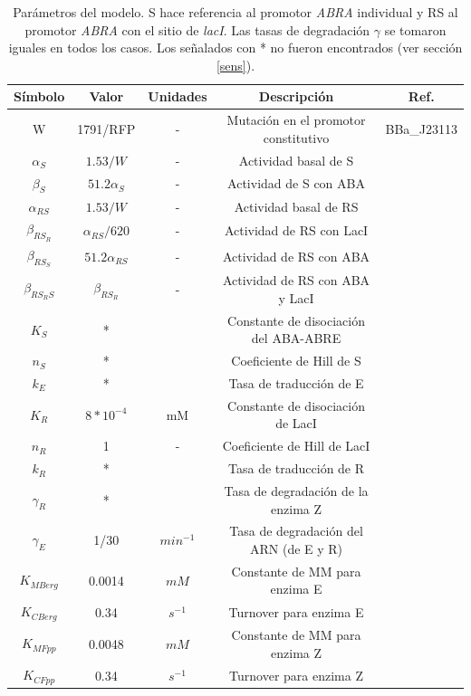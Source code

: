 \documentclass[12pt]{article}
\begin{document}
\begin{table}[H]
\centering
\begin{tabular}{c c c c c} 
 \hline
 S\'imbolo & Valor & Unidades & Descripci\'on & Ref. \\
 \hline\hline
 W & 1791/RFP & - & Mutaci\'on en el promotor constitutivo & BBa\_J23113 \\
 $\alpha_S$ & $1.53/W$ & - & Actividad basal de S & \cite{kelly09}  \\ 
 $\beta_S$ & $51.2 \alpha_S$ & - &  Actividad de S con ABA & \cite{hobo99} \\
 $\alpha_{RS}$ & $1.53/W$ & - & Actividad basal de RS & \cite{kelly09} \\
 $\beta_{RS_R}$ & $\alpha_{RS}/620$ & - & Actividad de RS con LacI & \cite{lutz97}\\
 $\beta_{RS_S}$ & $51.2 \alpha_{RS}$ & - & Actividad de  RS con ABA & \cite{hobo99} \\
 $\beta_{RS_RS}$ & $\beta_{RS_R}$ & - & Actividad de RS con ABA y LacI & \cite{lutz97} \\
 $K_S$ & * &  & Constante de disociaci\'on del ABA-ABRE &  \\
 $n_S$ & * &  & Coeficiente de Hill de S & \\
 $k_E$ & * &  & Tasa de traducci\'on de E &   \\
 $K_R$ & $8*10^{-4}$ & mM & Constante de disociaci\'on de LacI & \cite{basu05} \\
 $n_R$ & 1 & - & Coeficiente de Hill de LacI & \cite{kalisky07}\\
 $k_R$ & * & & Tasa de traducci\'on de R & \\
 $\gamma_R$ & * & & Tasa de degradaci\'on de la enzima Z & \\
 $\gamma_E$ & 1/30 & $min^{-1}$ & Tasa de degradaci\'on del ARN (de E y R) & \\
 $K_{MBerg}$ & 0.0014 & $mM$ & Constante de MM para enzima E & \cite{jones11} \\
 $K_{CBerg}$ & 0.34 & $s^{-1}$ & Turnover para enzima E & \cite{jones11} \\
 $K_{MFpp}$ & 0.0048 & $mM$ & Constante de MM para enzima Z & \cite{kittleman07} \\
 $K_{CFpp}$ & 0.34 & $s^{-1}$ & Turnover para enzima Z & \cite{kittleman07} \\
 \hline
\end{tabular}
\caption{Par\'ametros del modelo. S hace referencia al promotor \emph{ABRA} individual y RS al promotor \emph{ABRA} con el sitio de \emph{lacI}. Las tasas de degradaci\'on $\gamma$ se tomaron iguales en todos los casos. Los se\~nalados con * no fueron encontrados (ver secci\'on \ref{sens}).}
\label{tab:1}
\end{table}
\end{document}
